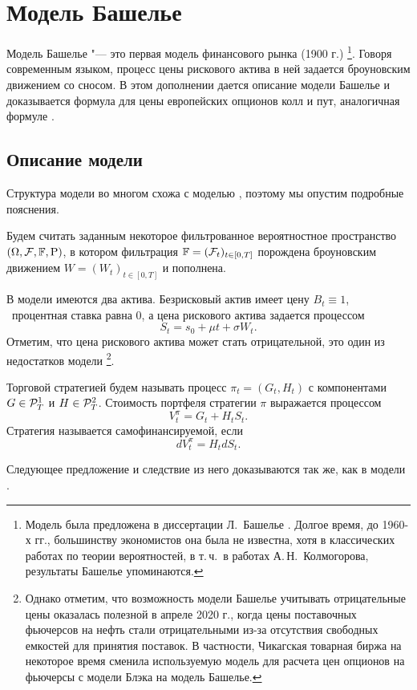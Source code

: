 \chapter{Модель Башелье}
\label{ch:bachelier}

Модель Башелье "--- это первая модель финансового рынка (1900 г.)%
\footnote{Модель была предложена в диссертации Л.~Башелье \cite{Bachelier00}.
Долгое время, до 1960-х гг., большинству экономистов она была не известна, хотя в классических работах по теории вероятностей, в т.\,ч.~в работах А.\,Н.~Колмогорова, результаты Башелье упоминаются.}.
Говоря современным языком, процесс цены рискового актива в ней задается броуновским движением со сносом.
В этом дополнении дается описание модели Башелье и доказывается формула для цены европейских опционов колл и пут, аналогичная формуле \bs.

\section{Описание модели}
Структура модели во многом схожа с моделью \bs, поэтому мы опустим подробные пояснения.

Будем считать заданным некоторое фильтрованное вероятностное пространство $(\Omega,\mathcal{F},\mathbb{F},\mathrm{P})$, в котором фильтрация $\mathbb{F}=(\mathcal{F}_t)_{t\in[0,T]}$ порождена броуновским движением $W=(W_t)_{t\in[0,T]}$ и пополнена.

В модели имеются два актива.
Безрисковый актив имеет цену $B_t\equiv 1$, \te\ процентная ставка равна 0, а цена рискового актива задается процессом
\[
S_t = s_0 + \mu t + \sigma W_t.
\]
Отметим, что цена рискового актива может стать отрицательной,
это один из недостатков модели%
\footnote{Однако отметим, что возможность модели Башелье учитывать отрицательные цены оказалась полезной в апреле 2020 г., когда цены поставочных фьючерсов на нефть стали отрицательными из-за отсутствия свободных емкостей для принятия поставок.
В частности, Чикагская товарная биржа на некоторое время сменила используемую модель для расчета цен опционов на фьючерсы с модели Блэка на модель Башелье.}.

Торговой стратегией будем называть процесс $\pi_t=(G_t,H_t)$ с компонентами $G\in \mathcal{P}_T^1$ и $H\in\mathcal{P}_T^2$.
Стоимость портфеля стратегии $\pi$ выражается процессом
\[
V_t^\pi = G_t + H_tS_t.
\]
Стратегия называется самофинансируемой, если
\[
d V_t^\pi = H_t dS_t.
\]

Следующее предложение и следствие из него доказываются так же, как в модели \bs.

